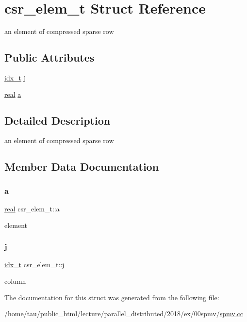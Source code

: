 \hypertarget{structcsr__elem__t}{}\section{csr\+\_\+elem\+\_\+t Struct Reference}
\label{structcsr__elem__t}


an element of compressed sparse row  


\subsection*{Public Attributes}
\begin{DoxyCompactItemize}
\item 
\hyperlink{spmv_8cc_a8e93478a00e685bea5e6a3f617bf03a3}{idx\+\_\+t} \hyperlink{structcsr__elem__t_a4525598ab26d6263b2242cc33511ca7f}{j}
\item 
\hyperlink{spmv_8cc_a11d147c64891830c9e79b3315b1b2e21}{real} \hyperlink{structcsr__elem__t_a55e480eefa495ee8b6e359a5f5a94a4f}{a}
\end{DoxyCompactItemize}


\subsection{Detailed Description}
an element of compressed sparse row 

\subsection{Member Data Documentation}
\mbox{\label{structcsr__elem__t_a55e480eefa495ee8b6e359a5f5a94a4f}} 
\subsubsection{\texorpdfstring{a}{a}}
{\footnotesize\ttfamily \hyperlink{spmv_8cc_a11d147c64891830c9e79b3315b1b2e21}{real} csr\+\_\+elem\+\_\+t\+::a}

element \mbox{\label{structcsr__elem__t_a4525598ab26d6263b2242cc33511ca7f}} 
\subsubsection{\texorpdfstring{j}{j}}
{\footnotesize\ttfamily \hyperlink{spmv_8cc_a8e93478a00e685bea5e6a3f617bf03a3}{idx\+\_\+t} csr\+\_\+elem\+\_\+t\+::j}

column 

The documentation for this struct was generated from the following file\+:\begin{DoxyCompactItemize}
\item 
/home/tau/public\+\_\+html/lecture/parallel\+\_\+distributed/2018/ex/00spmv/\hyperlink{spmv_8cc}{spmv.\+cc}\end{DoxyCompactItemize}
